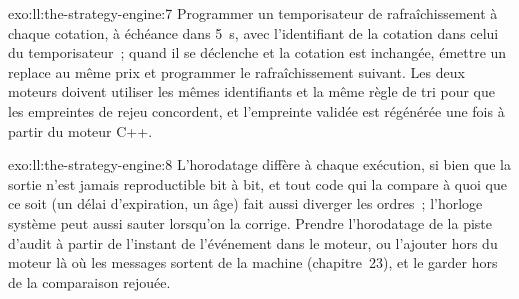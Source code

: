 \begin{solution}{exo:ll:the-strategy-engine:7}
Programmer un temporisateur de rafraîchissement à chaque cotation, à échéance dans \qty{5}{\second}, avec l'identifiant de la cotation dans celui du temporisateur~; quand il se déclenche et
la cotation est inchangée, émettre un replace au même prix et programmer le rafraîchissement suivant. Les deux moteurs doivent utiliser les mêmes
identifiants et la même règle de tri pour que les empreintes de rejeu concordent, et l'empreinte validée est régénérée une fois à partir du
moteur C++.
\end{solution}

\begin{solution}{exo:ll:the-strategy-engine:8}
L'horodatage diffère à chaque exécution, si bien que la sortie n'est jamais reproductible bit à bit, et tout code qui la compare à quoi que ce soit
(un délai d'expiration, un âge) fait aussi diverger les ordres~; l'horloge système peut aussi sauter lorsqu'on la corrige. Prendre l'horodatage de la piste d'audit
à partir de l'instant de l'événement dans le moteur, ou l'ajouter hors du moteur là où les messages sortent de la machine (chapitre~23), et le garder
hors de la comparaison rejouée.
\end{solution}

